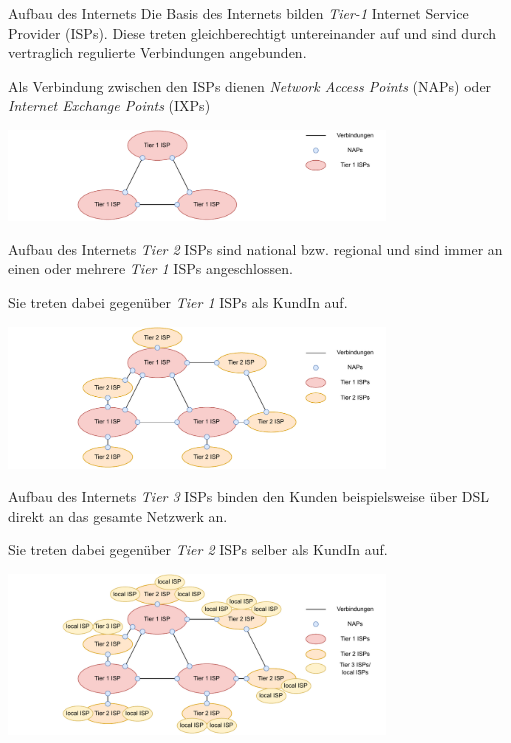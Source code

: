 \begin{bonus}{Aufbau des Internets}
    Die Basis des Internets bilden \emph{Tier-1} Internet Service Provider (ISPs).
    Diese treten gleichberechtigt untereinander auf und sind durch vertraglich regulierte Verbindungen angebunden.

    Als Verbindung zwischen den ISPs dienen \emph{Network Access Points} (NAPs) oder \emph{Internet Exchange Points} (IXPs)

    \begin{center}
        \includegraphics[width=0.75\textwidth]{includes/figures/bonus_aufbau_internet_1.pdf}
    \end{center}
\end{bonus}

\begin{bonus}{Aufbau des Internets}
    \emph{Tier 2} ISPs sind national bzw. regional und sind immer an einen oder mehrere \emph{Tier 1} ISPs angeschlossen.

    Sie treten dabei gegenüber \emph{Tier 1} ISPs als KundIn auf.

    \begin{center}
        \includegraphics[width=0.75\textwidth]{includes/figures/bonus_aufbau_internet_2.pdf}
    \end{center}
\end{bonus}

\begin{bonus}{Aufbau des Internets}
    \emph{Tier 3} ISPs binden den Kunden beispielsweise über DSL direkt an das gesamte Netzwerk an.

    Sie treten dabei gegenüber \emph{Tier 2} ISPs selber als KundIn auf.

    \begin{center}
        \includegraphics[width=0.75\textwidth]{includes/figures/bonus_aufbau_internet_3.pdf}
    \end{center}
\end{bonus}

